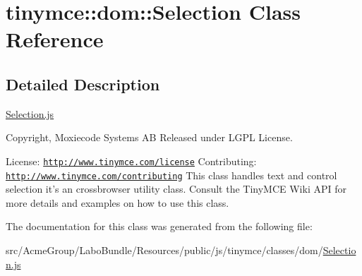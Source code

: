 \hypertarget{classtinymce_1_1dom_1_1_selection}{\section{tinymce\+:\+:dom\+:\+:Selection Class Reference}
\label{classtinymce_1_1dom_1_1_selection}
}


\subsection{Detailed Description}
\hyperlink{_selection_8js}{Selection.\+js}

Copyright, Moxiecode Systems A\+B Released under L\+G\+P\+L License.

License\+: \href{http://www.tinymce.com/license}{\tt http\+://www.\+tinymce.\+com/license} Contributing\+: \href{http://www.tinymce.com/contributing}{\tt http\+://www.\+tinymce.\+com/contributing} This class handles text and control selection it's an crossbrowser utility class. Consult the Tiny\+M\+C\+E Wiki A\+P\+I for more details and examples on how to use this class. 

The documentation for this class was generated from the following file\+:\begin{DoxyCompactItemize}
\item 
src/\+Acme\+Group/\+Labo\+Bundle/\+Resources/public/js/tinymce/classes/dom/\hyperlink{_selection_8js}{Selection.\+js}\end{DoxyCompactItemize}
